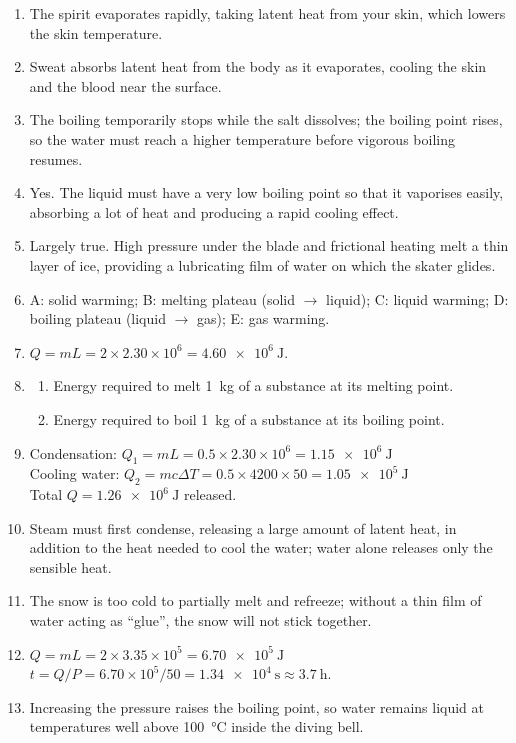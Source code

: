 \documentclass{article}
\begin{document}
\begin{enumerate}
\item The spirit evaporates rapidly, taking latent heat from your skin, which lowers the skin temperature.

\item Sweat absorbs latent heat from the body as it evaporates, cooling the skin and the blood near the surface.

\item The boiling temporarily stops while the salt dissolves; the boiling point rises, so the water must reach a higher temperature before vigorous boiling resumes.

\item Yes.  The liquid must have a very low boiling point so that it vaporises easily, absorbing a lot of heat and producing a rapid cooling effect.

\item Largely true.  High pressure under the blade and frictional heating melt a thin layer of ice, providing a lubricating film of water on which the skater glides.

\item A: solid warming; B: melting plateau (solid $\rightarrow$ liquid); C: liquid warming; D: boiling plateau (liquid $\rightarrow$ gas); E: gas warming.

\item $Q = mL = 2 \times 2.30\times10^{6} = \SI{4.60e6}{\joule}$.

\item 
  \begin{enumerate}
    \item Energy required to melt \SI{1}{\kilogram} of a substance at its melting point.  
    \item Energy required to boil \SI{1}{\kilogram} of a substance at its boiling point.
  \end{enumerate}

\item Condensation: $Q_{1}= mL = 0.5 \times 2.30\times10^{6} = \SI{1.15e6}{\joule}$\\
      Cooling water: $Q_{2}= mc\Delta T = 0.5 \times 4200 \times 50 = \SI{1.05e5}{\joule}$\\
      Total $Q = \SI{1.26e6}{\joule}$ released.

\item Steam must first condense, releasing a large amount of latent heat, in addition to the heat needed to cool the water; water alone releases only the sensible heat.

\item The snow is too cold to partially melt and refreeze; without a thin film of water acting as ``glue'', the snow will not stick together.

\item $Q = mL = 2 \times 3.35\times10^{5} = \SI{6.70e5}{\joule}$\\
      $t = Q/P = 6.70\times10^{5} / 50 = \SI{1.34e4}{\second} \approx \SI{3.7}{\hour}$.

\item Increasing the pressure raises the boiling point, so water remains liquid at temperatures well above \SI{100}{\celsius} inside the diving bell.
\end{enumerate}
\end{document}
